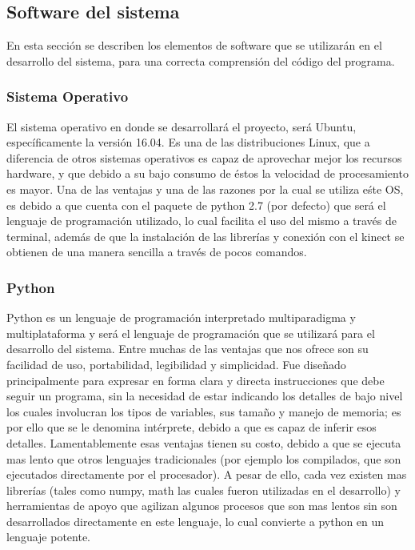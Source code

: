 \documentclass[a4paper,openright,12pt]{report}
\begin{document}
\subsection{Software del sistema}
En esta sección se describen los elementos de software que se utilizarán en el desarrollo del sistema, para una correcta comprensión del código del programa.
\subsubsection{Sistema Operativo}
El sistema operativo en donde se desarrollará el proyecto, será Ubuntu, específicamente la versión 16.04. Es una de las distribuciones Linux, que a diferencia de otros sistemas operativos es capaz de aprovechar mejor los recursos hardware, y que debido a su bajo consumo de éstos la velocidad de procesamiento es mayor. Una de las ventajas y una de las razones por la cual se utiliza eśte OS, es debido a que cuenta con el paquete de python 2.7 (por defecto) que será el lenguaje de programación utilizado, lo cual facilita el uso del mismo a través de terminal, además de que la instalación de las librerías y conexión con el kinect se obtienen de una manera sencilla a través de pocos comandos. 
\subsubsection{Python}
Python es un lenguaje de programación interpretado multiparadigma y multiplataforma y será el lenguaje de programación que se utilizará para el desarrollo del sistema. Entre muchas de las ventajas que nos ofrece son su facilidad de uso, portabilidad, legibilidad y simplicidad. Fue diseñado principalmente para expresar en forma clara y directa instrucciones que debe seguir un programa, sin la necesidad de estar indicando los detalles de bajo nivel los cuales involucran los tipos de variables, sus tamaño y manejo de memoria; es por ello que se le denomina intérprete, debido a que es capaz de inferir esos detalles. Lamentablemente esas ventajas tienen su costo, debido a que se ejecuta mas lento que otros lenguajes tradicionales (por ejemplo los compilados, que son ejecutados directamente por el procesador). A pesar de ello, cada vez existen mas librerías (tales como numpy, math las cuales fueron utilizadas en el desarrollo) y herramientas de apoyo que agilizan algunos procesos que son mas lentos sin son desarrollados directamente en este lenguaje, lo cual convierte a python en un lenguaje potente. 
\end{document}
